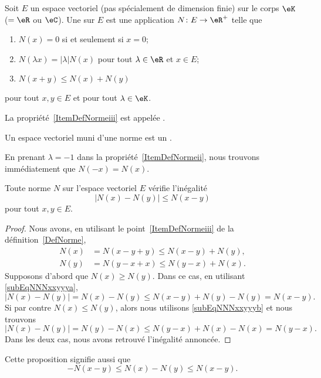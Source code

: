 \begin{definition}  \label{DefNorme}
    Soit \( E\) un espace vectoriel (pas spécialement de dimension finie) sur le corps \( \eK\) (\( =\eR\) ou \( \eC\)). Une   sur $E$ est une application $N\colon E\to \eR^+$ telle que
	\begin{enumerate}
		\item
            \( N(x)=0\) si et seulement si \( x=0\);
		\item\label{ItemDefNormeii}
			$N(\lambda x)=| \lambda |N(x)$ pour tout $\lambda\in\eR$ et $x\in E$;
		\item\label{ItemDefNormeiii}
			$N(x+y)\leq N(x)+N(y)$
	\end{enumerate}
    pour tout $x,y\in E$ et pour tout $\lambda\in\eK$.

    La propriété~\ref{ItemDefNormeiii} est appelée .

    Un espace vectoriel muni d'une norme est un .
\end{definition}
En prenant $\lambda=-1$ dans la propriété~\ref{ItemDefNormeii}, nous trouvons immédiatement que $N(-x)=N(x)$.

\begin{proposition}		\label{PropNmNNm}
	Toute norme $N$ sur l'espace vectoriel $E$ vérifie l'inégalité
	\begin{equation}
		\big| N(x)-N(y) \big|\leq N(x-y)
	\end{equation}
	pour tout $x,y\in E$.
\end{proposition}

\begin{proof}
	Nous avons, en utilisant le point~\ref{ItemDefNormeiii} de la définition~\ref{DefNorme},
	\begin{subequations}
		\begin{align}
			N(x)&=N(x-y+y)\leq N(x-y)+N(y),	\label{subEqNNNxxyyya}\\
			N(y)&=N(y-x+x)\leq N(y-x)+N(x).	\label{subEqNNNxxyyyb}
		\end{align}
	\end{subequations}
	Supposons d'abord que $N(x)\geq N(y)$. Dans ce cas, en utilisant \eqref{subEqNNNxxyyya},
	\begin{equation}
		\big| N(x)-N(y) \big|=N(x)-N(y)\leq N(x-y)+N(y)-N(y)=N(x-y).
	\end{equation}
	Si par contre $N(x)\leq N(y)$, alors nous utilisons \eqref{subEqNNNxxyyyb} et nous trouvons
	\begin{equation}
		\big| N(x)-N(y) \big|=N(y)-N(x)\leq N(y-x)+N(x)-N(x)=N(y-x).
	\end{equation}
	Dans les deux cas, nous avons retrouvé l'inégalité annoncée.
\end{proof}
Cette proposition signifie aussi que
\begin{equation}	\label{EqNleqNNleqNvqlqbs}
	-N(x-y)\leq N(x)-N(y)\leq N(x-y).
\end{equation}

